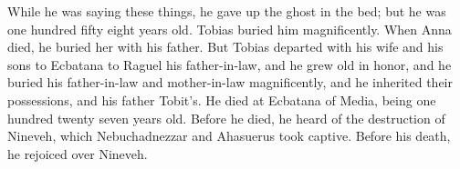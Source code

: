 While he was saying these things, he gave up the ghost in the bed; but
he was one hundred fifty eight years old. Tobias buried him
magnificently.  When Anna died, he buried her with his
father. But Tobias departed with his wife and his sons to Ecbatana to
Raguel his father-in-law,  and he grew old in honor, and
he buried his father-in-law and mother-in-law magnificently, and he
inherited their possessions, and his father Tobit's.  He
died at Ecbatana of Media, being one hundred twenty seven years old.
 Before he died, he heard of the destruction of Nineveh,
which Nebuchadnezzar and Ahasuerus took captive. Before his death, he
rejoiced over Nineveh.
